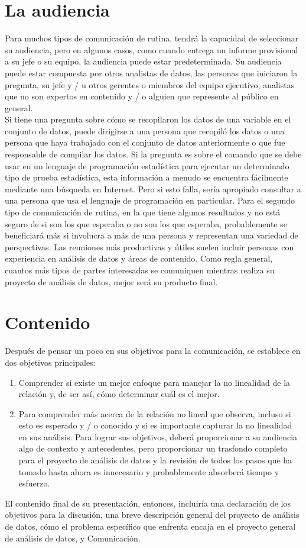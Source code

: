 \documentclass[10pt]{book}
\begin{document}
    \section{La audiencia}
    Para muchos tipos de comunicación de rutina, tendrá la capacidad de seleccionar su audiencia, pero en algunos casos, como cuando entrega un informe provisional a su jefe o su equipo, la audiencia puede estar predeterminada. Su audiencia puede estar compuesta por otros analistas de datos, las personas que iniciaron la pregunta, su jefe y / u otros gerentes o miembros del equipo ejecutivo, analistas que no son expertos en contenido y / o alguien que represente al público en general. \\
    Si tiene una pregunta sobre cómo se recopilaron los datos de una variable en el conjunto de datos, puede dirigirse a una persona que recopiló los datos o una persona que haya trabajado con el conjunto de datos anteriormente o que fue responsable de compilar los datos. Si la pregunta es sobre el comando que se debe usar en un lenguaje de programación estadística para ejecutar un determinado tipo de prueba estadística, esta información a menudo se encuentra fácilmente mediante una búsqueda en Internet. Pero si esto falla, sería apropiado consultar a una persona que usa el lenguaje de programación en particular. Para el segundo tipo de comunicación de rutina, en la que tiene algunos resultados y no está seguro de si son los que esperaba o no son los que esperaba, probablemente se beneficiará más si involucra a más de una persona y representan una variedad de perspectivas. Las reuniones más productivas y útiles suelen incluir personas con experiencia en análisis de datos y áreas de contenido. Como regla general, cuantos más tipos de partes interesadas se comuniquen mientras realiza su proyecto de análisis de datos, mejor será su producto final. 
    \section{Contenido}
    Después de pensar un poco en sus objetivos para la comunicación, se establece en dos objetivos principales: 
    \begin{enumerate}[\bfseries 1.]
	\item Comprender si existe un mejor enfoque para manejar la no linealidad de la relación y, de ser así, cómo determinar cuál es el mejor.
	\item Para comprender más acerca de la relación no lineal que observa, incluso si esto es esperado y / o conocido y si es importante capturar la no linealidad en sus análisis. Para lograr sus objetivos, deberá proporcionar a su audiencia algo de contexto y antecedentes, pero proporcionar un trasfondo completo para el proyecto de análisis de datos y la revisión de todos los pasos que ha tomado hasta ahora es innecesario y probablemente absorberá tiempo y esfuerzo.
    \end{enumerate}
    El contenido final de su presentación, entonces, incluiría una declaración de los objetivos para la discusión, una breve descripción general del proyecto de análisis de datos, cómo el problema específico que enfrenta encaja en el proyecto general de análisis de datos, y Comunicación. 
\end{document}

